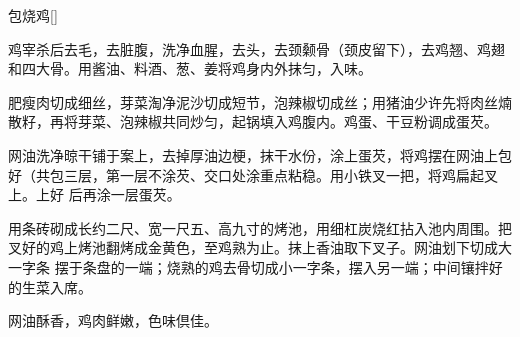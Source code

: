 \begin{recipe}{包烧鸡}[\footnotemark]

\ingredients



\preparation

\step 鸡宰杀后去毛，去脏腹，洗净血腥，去头，去颈颡骨（颈皮留下），去鸡翘、鸡翅
和四大骨。用酱油、料酒、葱、姜将鸡身内外抹匀，入味。

\step 肥瘦肉切成细丝，芽菜淘净泥沙切成短节，泡辣椒切成丝；用猪油少许先将肉丝煵
散籽，再将芽菜、泡辣椒共同炒匀，起锅填入鸡腹内。鸡蛋、干豆粉调成蛋芡。

\step 网油洗净晾干铺于案上，去掉厚油边梗，抹干水份，涂上蛋芡，将鸡摆在网油上包
好（共包三层，第一层不涂芡、交口处涂重点粘稳。用小铁叉一把，将鸡扁起叉上。上好
后再涂一层蛋芡。

\step 用条砖砌成长约二尺、宽一尺五、高九寸的烤池，用细杠炭烧红拈入池内周围。把
叉好的鸡上烤池翻烤成金黄色，至鸡熟为止。抹上香油取下叉子。网油划下切成大一字条
摆于条盘的一端；烧熟的鸡去骨切成小一字条，摆入另一端；中间镶拌好的生菜入席。

\features

网油酥香，鸡肉鲜嫩，色味倶佳。


\end{recipe}


